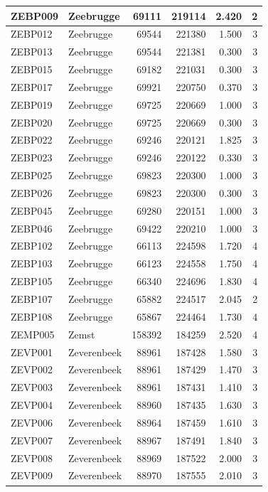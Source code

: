 \documentclass[11pt,]{book}
\begin{document}
\begin{table}
\begin{tabular}[t]{l|l|r|r|r|r}
ZEBP009 & Zeebrugge & 69111 & 219114 & 2.420 & 2\\
\hline
ZEBP012 & Zeebrugge & 69544 & 221380 & 1.500 & 3\\
\hline
ZEBP013 & Zeebrugge & 69544 & 221381 & 0.300 & 3\\
\hline
ZEBP015 & Zeebrugge & 69182 & 221031 & 0.300 & 3\\
\hline
ZEBP017 & Zeebrugge & 69921 & 220750 & 0.370 & 3\\
\hline
ZEBP019 & Zeebrugge & 69725 & 220669 & 1.000 & 3\\
\hline
ZEBP020 & Zeebrugge & 69725 & 220669 & 0.300 & 3\\
\hline
ZEBP022 & Zeebrugge & 69246 & 220121 & 1.825 & 3\\
\hline
ZEBP023 & Zeebrugge & 69246 & 220122 & 0.330 & 3\\
\hline
ZEBP025 & Zeebrugge & 69823 & 220300 & 1.000 & 3\\
\hline
ZEBP026 & Zeebrugge & 69823 & 220300 & 0.300 & 3\\
\hline
ZEBP045 & Zeebrugge & 69280 & 220151 & 1.000 & 3\\
\hline
ZEBP046 & Zeebrugge & 69422 & 220210 & 1.000 & 3\\
\hline
ZEBP102 & Zeebrugge & 66113 & 224598 & 1.720 & 4\\
\hline
ZEBP103 & Zeebrugge & 66123 & 224558 & 1.750 & 4\\
\hline
ZEBP105 & Zeebrugge & 66340 & 224696 & 1.830 & 4\\
\hline
ZEBP107 & Zeebrugge & 65882 & 224517 & 2.045 & 2\\
\hline
ZEBP108 & Zeebrugge & 65867 & 224464 & 1.730 & 4\\
\hline
ZEMP005 & Zemst & 158392 & 184259 & 2.520 & 4\\
\hline
ZEVP001 & Zeverenbeek & 88961 & 187428 & 1.580 & 3\\
\hline
ZEVP002 & Zeverenbeek & 88961 & 187429 & 1.470 & 3\\
\hline
ZEVP003 & Zeverenbeek & 88961 & 187431 & 1.410 & 3\\
\hline
ZEVP004 & Zeverenbeek & 88960 & 187435 & 1.630 & 3\\
\hline
ZEVP006 & Zeverenbeek & 88964 & 187459 & 1.610 & 3\\
\hline
ZEVP007 & Zeverenbeek & 88967 & 187491 & 1.840 & 3\\
\hline
ZEVP008 & Zeverenbeek & 88969 & 187522 & 2.000 & 3\\
\hline
ZEVP009 & Zeverenbeek & 88970 & 187555 & 2.010 & 3\\

\end{tabular}
\end{table}
\end{document}
